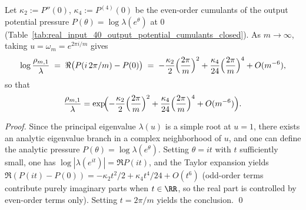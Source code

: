 \begin{corollary}\label{cor:real-input-40-output-dirichlet-cumulant-bridge}
Let \(\kappa_2:=P''(0)\), \(\kappa_4:=P^{(4)}(0)\) be the even-order cumulants of the output potential pressure \(P(\theta)=\log\lambda(e^\theta)\) at \(0\) (Table~\ref{tab:real_input_40_output_potential_cumulants_closed}).
As \(m\to\infty\), taking \(u=\omega_m=e^{2\pi i/m}\) gives
\[
\log\frac{\rho_{m,1}}{\lambda}
\;=\;
\Re\bigl(P(i\,2\pi/m)-P(0)\bigr)
\;=\;
-\frac{\kappa_2}{2}\Bigl(\frac{2\pi}{m}\Bigr)^2
+\frac{\kappa_4}{24}\Bigl(\frac{2\pi}{m}\Bigr)^4
+O(m^{-6}),
\]
so that
\[
\frac{\rho_{m,1}}{\lambda}
=\exp\!\Bigl(
-\frac{\kappa_2}{2}\Bigl(\frac{2\pi}{m}\Bigr)^2
+\frac{\kappa_4}{24}\Bigl(\frac{2\pi}{m}\Bigr)^4
+O(m^{-6})
\Bigr).
\]
\end{corollary}
\begin{proof}
Since the principal eigenvalue \(\lambda(u)\) is a simple root at \(u=1\), there exists an analytic eigenvalue branch in a complex neighborhood of \(u\), and one can define the analytic pressure \(P(\theta)=\log\lambda(e^\theta)\).
Setting \(\theta=i t\) with \(t\) sufficiently small, one has
\(
\log|\lambda(e^{it})|=\Re P(it)
\),
and the Taylor expansion yields
\(
\Re(P(it)-P(0))=-\kappa_2 t^2/2+\kappa_4 t^4/24+O(t^6)
\)
(odd-order terms contribute purely imaginary parts when \(t\in\RR\), so the real part is controlled by even-order terms only).
Setting \(t=2\pi/m\) yields the conclusion. \qed
\end{proof}



